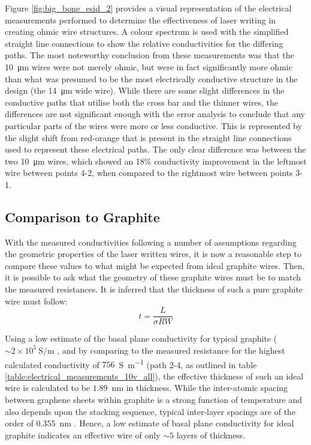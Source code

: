 \begin{refsection}
Figure \ref{fig:big_bone_esid_2} provides a visual representation of the electrical measurements performed to determine the effectiveness of laser writing in creating ohmic wire structures. A colour spectrum is used with the simplified straight line connections to show the relative conductivities for the differing paths. The most noteworthy conclusion from these measurements was that the 10~\si{\micro\metre} wires were not merely ohmic, but were in fact significantly more ohmic than what was presumed to be the most electrically conductive structure in the design (the 14~\si{\micro\metre} wide wire). While there are some slight differences in the conductive paths that utilise both the cross bar and the thinner wires, the differences are not significant enough with the error analysis to conclude that any particular parts of the wires were more or less conductive. This is represented by the slight shift from red-orange that is present in the straight line connections used to represent these electrical paths. The only clear difference was between the two 10~\si{\micro\metre} wires, which showed an 18\% conductivity improvement in the leftmost wire between points 4-2, when compared to the rightmost wire between points 3-1.

\subsection{Comparison to Graphite}
\label{subsubsec:comparison_to_graphite}
With the measured conductivities following a number of assumptions regarding the geometric properties of the laser written wires, it is now a reasonable step to compare these values to what might be expected from ideal graphite wires. Then, it is possible to ask what the geometry of these graphite wires must be to match the measured resistances. It is inferred that the thickness of such a pure graphite wire must follow:
\begin{equation}
    t = \frac{L}{\sigma RW}
    \label{eq:thickness_conductivity}
\end{equation}

Using a low estimate of the basal plane conductivity for typical graphite ($\sim2\times10^{5}~\si{\siemens\per\metre}$ \cite{pierson1993}, and by comparing to the measured resistance for the highest calculated conductivity of $756$~\si{\siemens\per\metre} (path 2-4, as outlined in table \ref{table:electrical_measurements_10v_all}), the effective thickness of such an ideal wire is calculated to be $1.89$~\si{\nano\metre} in thickness. While the inter-atomic spacing between graphene sheets within graphite is a strong function of temperature and also depends upon the stacking sequence, typical inter-layer spacings are of the order of $0.355$~\si{\nano\metre} \cite{pierson1993}. Hence, a low estimate of basal plane conductivity for ideal graphite indicates an effective wire of only $\sim5$ layers of thickness.


\end{refsection}
